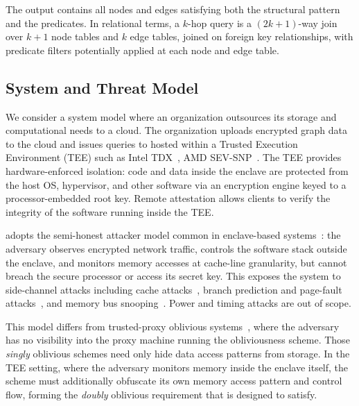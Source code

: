 The output contains all nodes and edges satisfying both the structural pattern 
and the predicates. In relational terms, a $k$-hop query is a $(2k+1)$-way 
join over $k+1$ node tables and $k$ edge tables, joined on foreign key 
relationships, with predicate filters potentially applied at each node and edge table.
\subsection{System and Threat Model}
\label{sec:background:threat}
We consider a system model where an organization outsources its storage and computational needs to a 
cloud. The organization uploads encrypted graph data to the cloud and issues queries to \system hosted
within a Trusted Execution Environment (TEE) such as Intel TDX~\cite{intel_tdx}, AMD SEV-SNP~\cite{sev2020strengthening}. The TEE provides hardware-enforced 
isolation: code and data inside the enclave are protected from the host OS, 
hypervisor, and other software via an encryption engine keyed to a 
processor-embedded root key. Remote attestation allows clients to verify the 
integrity of the software running inside the TEE.

\system adopts the semi-honest attacker model common in enclave-based 
systems~\cite{dauterman2021snoopy, krastnikov2020efficient, mishra2018oblix, 
chamani2023graphos, mavrogiannakis2025obliviator}: the adversary observes 
encrypted network traffic, controls the software stack outside the enclave, 
and monitors memory accesses at cache-line granularity, but cannot breach the 
secure processor or access its secret key. This exposes the system to 
side-channel attacks including cache attacks~\cite{brasser2017software, 
hahnel2017high, moghimi2017cachezoom, schwarz2017malware}, branch prediction 
and page-fault attacks~\cite{lee2017inferring, van2017telling, xu2015controlled}, 
and memory bus snooping~\cite{lee2020off}. Power and timing attacks are out 
of scope.

This model differs from trusted-proxy oblivious 
systems~\cite{ahmed2025oasisdb, demertzis2020seal, li2014fast, 
chang2022towards, chang2021efficient}, where the adversary has no visibility 
into the proxy machine running the obliviousness scheme. Those \emph{singly} 
oblivious schemes need only hide data access patterns from storage. In the 
TEE setting, where the adversary monitors memory inside the enclave itself, 
the scheme must additionally obfuscate its own memory access pattern and 
control flow, forming the \emph{doubly} oblivious requirement that \system is 
designed to satisfy.

